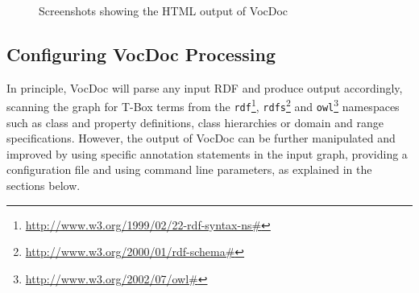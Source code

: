 \documentclass{article}
\begin{document}
\begin{figure}
  \begin{center}
	\caption{Screenshots showing the HTML output of VocDoc}
	\label{fig:vocdoc_html}
  \end{center}
\end{figure}





\subsection{Configuring VocDoc Processing} %
\label{sub:configuration}

In principle, VocDoc will parse any input RDF and produce output accordingly, scanning the graph for T-Box terms from the \texttt{rdf}\footnote{\url{http://www.w3.org/1999/02/22-rdf-syntax-ns\#}}, 
\texttt{rdfs}\footnote{\url{http://www.w3.org/2000/01/rdf-schema\#}} and 
\texttt{owl}\footnote{\url{http://www.w3.org/2002/07/owl\#}} 
namespaces such as class and property definitions, class hierarchies or domain and range specifications. However, the output of VocDoc can be further manipulated and improved by using specific annotation statements in the input graph, providing a configuration file and using command line parameters, as explained in the sections below.
\end{document}
